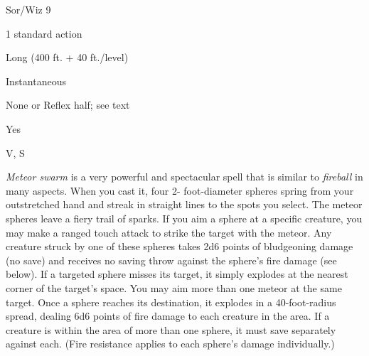 
\begin{description*}
\item[Level:] Sor/Wiz 9
\item[Casting Time:] 1 standard action
\item[Range:] Long (400 ft. + 40 ft./level)
\item[Duration:] Instantaneous
\item[Saving Throw:] None or Reflex half; see text
\item[Spell Resistance:] Yes
\item[Components:] V, S
\end{description*}

\textit{Meteor swarm} is a very powerful and spectacular spell that is similar
to \textit{fireball} in many aspects. When you cast it, four 2- foot-diameter spheres
spring from your outstretched hand and streak in straight lines to the spots you
select. The meteor spheres leave a fiery trail of sparks.
If you aim a sphere at a specific creature, you may make a ranged touch attack
to strike the target with the meteor. Any creature struck by one of these spheres
takes 2d6 points of bludgeoning damage (no save) and receives no saving throw against
the sphere's fire damage (see below). If a targeted sphere misses its target, it
simply explodes at the nearest corner of the target's space. You may aim more than
one meteor at the same target.
Once a sphere reaches its destination, it explodes in a 40-foot-radius spread,
dealing 6d6 points of fire damage to each creature in the area. If a creature is
within the area of more than one sphere, it must save separately against each.
(Fire resistance applies to each sphere's damage individually.)